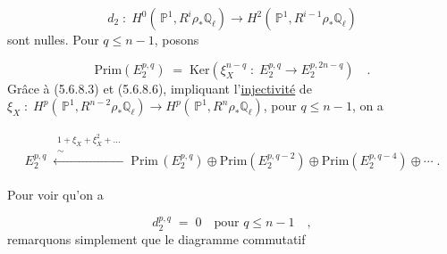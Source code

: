 \begin{equation*}
d_2 \; : \; H^0(\, \mathbb{P}^1,R^i \rho_* \mathbb{Q}_\ell) \longrightarrow H^2(\, \mathbb{P}^1,R^{i-1}\rho_* \mathbb{Q}_\ell)
\end{equation*}
sont nulles. Pour $q \leq n - 1$, posons

\begin{equation}\tag{5.6.8.9}
\mathrm{Prim}(E_2^{p,q}) \; = \; \mathrm{Ker}(\xi_X^{n-q} \; : \; E_2^{p,q} \longrightarrow E_2^{p,2n-q}) \quad .
\end{equation}
Grâce à (5.6.8.3) et (5.6.8.6), impliquant l'\underline{injectivité} de $\xi_X \; : \; H^p(\, \mathbb{P}^1,R^{n-2}\rho_* \mathbb{Q}_\ell) \longrightarrow H^p(\, \mathbb{P}^1, R^n \rho_* \mathbb{Q}_\ell)$, pour $q \leq n - 1$, on a

\begin{multline}\tag{5.6.8.10}
E_2^{p,q} \; \xleftarrow{\substack{1+\xi_X+\xi_X^2+\dots \\ \sim}} \; \mathrm{Prim}\,(E_2^{p,q}) \oplus \mathrm{Prim}(E_2^{p,q-2}) \oplus \mathrm{Prim}(E_2^{p,q-4}) \oplus \cdots \; .
\end{multline}


Pour voir qu'on a

\begin{equation*}
d_2^{p,q} \;=\; 0 \quad \text{pour } q \leq n - 1 \quad ,
\end{equation*}
remarquons simplement que le diagramme commutatif

